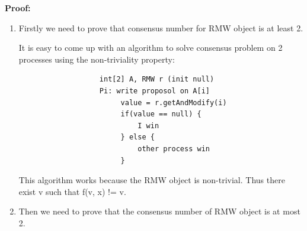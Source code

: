 \documentclass[twoside]{article}
\begin{document}
\textbf{Proof:}
\begin{enumerate}
  \item Firstly we need to prove that consensus number for RMW object is at least 2. 
  
           It is easy to come up with an algorithm to solve consensus problem on 2 processes using the non-triviality property: \\
           \begin{center}
               \begin{lstlisting}
                   int[2] A, RMW r (init null)
                   Pi: write proposol on A[i]
                        value = r.getAndModify(i)
                        if(value == null) {
                            I win
                        } else {
                            other process win
                        }
               \end{lstlisting}
           \end{center}
           This algorithm works because the RMW object is non-trivial. Thus there exist v such that f(v, x) != v.
    \item Then we need to prove that the consensus number of RMW object is at most 2.  
    

\end{enumerate}
\end{document}
